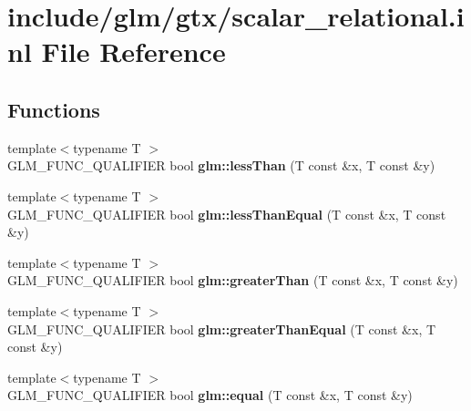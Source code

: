 \hypertarget{scalar__relational_8inl}{}\section{include/glm/gtx/scalar\+\_\+relational.inl File Reference}
\label{scalar__relational_8inl}
\subsection*{Functions}
\begin{DoxyCompactItemize}
\item 
\mbox{\label{scalar__relational_8inl_a6f2a3cef357dbf21b5fc90aded289ba1}} 
{\footnotesize template$<$typename T $>$ }\\G\+L\+M\+\_\+\+F\+U\+N\+C\+\_\+\+Q\+U\+A\+L\+I\+F\+I\+ER bool {\bfseries glm\+::less\+Than} (T const \&x, T const \&y)
\item 
\mbox{\label{scalar__relational_8inl_a299eb11fb67637d37144dc0fcc6c6ff3}} 
{\footnotesize template$<$typename T $>$ }\\G\+L\+M\+\_\+\+F\+U\+N\+C\+\_\+\+Q\+U\+A\+L\+I\+F\+I\+ER bool {\bfseries glm\+::less\+Than\+Equal} (T const \&x, T const \&y)
\item 
\mbox{\label{scalar__relational_8inl_ae567b870c79fb61cf069d489133eaf48}} 
{\footnotesize template$<$typename T $>$ }\\G\+L\+M\+\_\+\+F\+U\+N\+C\+\_\+\+Q\+U\+A\+L\+I\+F\+I\+ER bool {\bfseries glm\+::greater\+Than} (T const \&x, T const \&y)
\item 
\mbox{\label{scalar__relational_8inl_a03e93d49cec76267c3e11fd68381639a}} 
{\footnotesize template$<$typename T $>$ }\\G\+L\+M\+\_\+\+F\+U\+N\+C\+\_\+\+Q\+U\+A\+L\+I\+F\+I\+ER bool {\bfseries glm\+::greater\+Than\+Equal} (T const \&x, T const \&y)
\item 
\mbox{\label{scalar__relational_8inl_a9943cfbeef0a00a2becb541e9e3818ed}} 
{\footnotesize template$<$typename T $>$ }\\G\+L\+M\+\_\+\+F\+U\+N\+C\+\_\+\+Q\+U\+A\+L\+I\+F\+I\+ER bool {\bfseries glm\+::equal} (T const \&x, T const \&y)

\end{DoxyCompactItemize}
